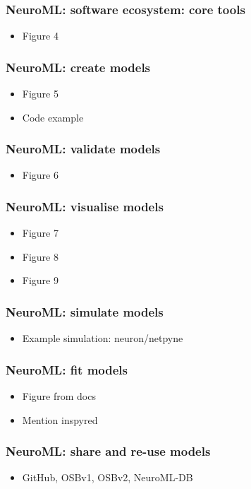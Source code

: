 \begin{frame}[c]
  \frametitle{NeuroML: software ecosystem: core tools}
  \begin{itemize}
    \item Figure 4
  \end{itemize}
\end{frame}
\begin{frame}[c]
  \frametitle{NeuroML: create models}
  \begin{itemize}
    \item Figure 5
    \item Code example
  \end{itemize}
\end{frame}
\begin{frame}[c]
  \frametitle{NeuroML: validate models}
  \begin{itemize}
    \item Figure 6
  \end{itemize}
\end{frame}
\begin{frame}[c]
  \frametitle{NeuroML: visualise models}
  \begin{itemize}
    \item Figure 7
    \item Figure 8
    \item Figure 9
  \end{itemize}
\end{frame}
\begin{frame}[c]
  \frametitle{NeuroML: simulate models}
  \begin{itemize}
    \item Example simulation: neuron/netpyne
  \end{itemize}
\end{frame}
\begin{frame}[c]
  \frametitle{NeuroML: fit models}
  \begin{itemize}
    \item Figure from docs
    \item Mention inspyred
  \end{itemize}
\end{frame}
\begin{frame}[c]
  \frametitle{NeuroML: share and re-use models}
  \begin{itemize}
    \item GitHub, OSBv1, OSBv2, NeuroML-DB
  \end{itemize}
\end{frame}
